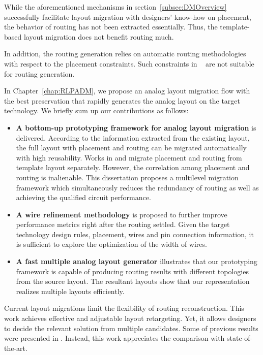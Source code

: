       While the aforementioned mechanisms in section~\ref{subsec:DMOverview} successfully facilitate layout migration with designers' know-how on placement, the behavior of routing has not been extracted essentially. Thus, the template-based layout migration does not benefit routing much. 
 
      In addition, the routing generation relies on automatic routing methodologies with respect to the placement constraints. Such constraints in ~\cite{cbc-bhattacharya-dac04,Bhattacharya_ASPDAC04,msc-bhattacharya-tcad06,Zhang_TCAD08,Wang_ALRGP_TODAES2011} are not suitable for routing generation. 

      In Chapter~\ref{chap:RLPADM}, we propose an analog layout migration flow with the best preservation that rapidly generates the analog layout on the target technology. We briefly sum up our contributions as follows:

      \begin{itemize}
        \item {\bf A bottom-up prototyping framework for analog layout migration} is delivered. According to the information extracted from the existing layout, the full layout with placement and routing can be migrated automatically with high reusability. Works in \cite{ALP_YPWeng_iccad2011} and \cite{Chin_DMR_ICCAD2013} migrate placement and routing from template layout separately. However, the correlation among placement and routing is inalienable. This dissertation proposes a multilevel migration framework which simultaneously reduces the redundancy of routing as well as achieving the qualified circuit performance.
        \item {\bf A wire refinement methodology} is proposed to further improve performance metrics right after the routing settled. Given the target technology design rules, placement, wires and pin connection information, it is sufficient to explore the optimization of the width of wires.
        \item {\bf A fast multiple analog layout generator} illustrates that our prototyping framework is capable of producing routing results with different topologies from the source layout. The resultant layouts show that our representation realizes multiple layouts efficiently.
      \end{itemize}

      Current layout migrations limit the flexibility of routing reconstruction. This work achieves effective and adjustable layout retargeting. Yet, it allows designers to decide the relevant solution from multiple candidates. Some of previous results were presented in \cite{Chin_DMR_ICCAD2013}. Instead, this work appreciates the comparison with state-of-the-art.


